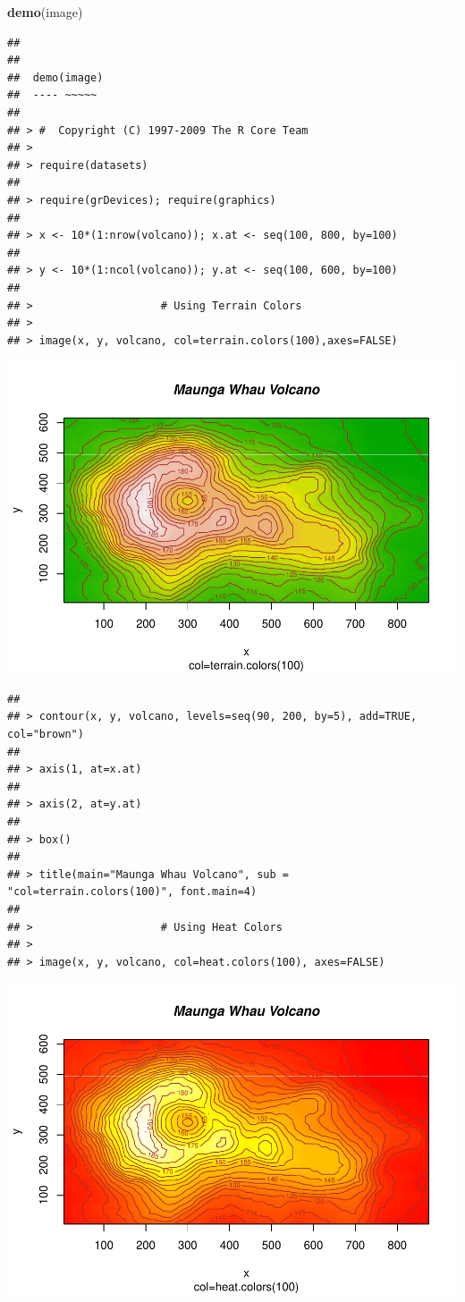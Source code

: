 \documentclass[
]{book}
\newenvironment{Shaded}{\begin{snugshade}}{\end{snugshade}}
\newcommand{\KeywordTok}[1]{\textcolor[rgb]{0.13,0.29,0.53}{\textbf{#1}}}
\newcommand{\NormalTok}[1]{#1}
\begin{document}
\begin{Shaded}
\begin{Highlighting}[]
\KeywordTok{demo}\NormalTok{(image)}
\end{Highlighting}
\end{Shaded}

\begin{verbatim}
## 
## 
##  demo(image)
##  ---- ~~~~~
## 
## > #  Copyright (C) 1997-2009 The R Core Team
## > 
## > require(datasets)
## 
## > require(grDevices); require(graphics)
## 
## > x <- 10*(1:nrow(volcano)); x.at <- seq(100, 800, by=100)
## 
## > y <- 10*(1:ncol(volcano)); y.at <- seq(100, 600, by=100)
## 
## >                    # Using Terrain Colors
## > 
## > image(x, y, volcano, col=terrain.colors(100),axes=FALSE)
\end{verbatim}

\includegraphics{TudodoR_files/figure-latex/unnamed-chunk-145-1.pdf}

\begin{verbatim}
## 
## > contour(x, y, volcano, levels=seq(90, 200, by=5), add=TRUE, col="brown")
## 
## > axis(1, at=x.at)
## 
## > axis(2, at=y.at)
## 
## > box()
## 
## > title(main="Maunga Whau Volcano", sub = "col=terrain.colors(100)", font.main=4)
## 
## >                    # Using Heat Colors
## > 
## > image(x, y, volcano, col=heat.colors(100), axes=FALSE)
\end{verbatim}

\includegraphics{TudodoR_files/figure-latex/unnamed-chunk-145-2.pdf}
\end{document}
